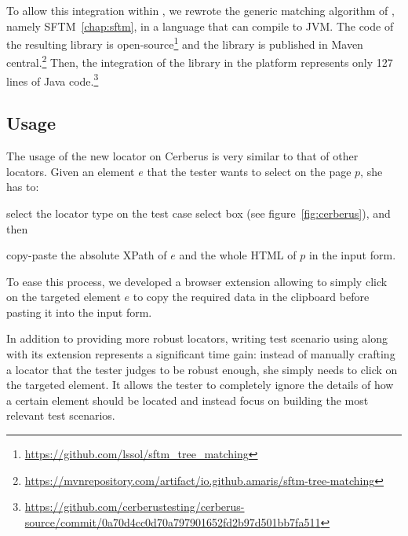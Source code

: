 
To allow this integration within \cerberus, we rewrote the generic matching algorithm of \erratum, namely SFTM~\ref{chap:sftm}, in a language that can compile to JVM.
The code of the resulting library is open-source\footnote{\url{https://github.com/lssol/sftm\_tree\_matching}} and the library is published in Maven central.\footnote{\url{https://mvnrepository.com/artifact/io.github.amaris/sftm-tree-matching}}
Then, the integration of the \erratum library in the \cerberus platform represents only 127 lines of Java code.\footnote{\url{https://github.com/cerberustesting/cerberus-source/commit/0a70d4cc0d70a797901652fd2b97d501bb7fa511}}

\subsection{Usage}
The usage of the new \erratum locator on Cerberus is very similar to that of other locators.
Given an element $e$ that the tester wants to select on the page $p$, she has to:
\begin{compactenum}
\item select the \erratum locator type on the test case select box (see figure~\ref{fig:cerberus}), and then
\item copy-paste the absolute XPath of $e$ and the whole HTML of $p$ in the input form.
\end{compactenum}
To ease this process, we developed a browser extension allowing to simply click on the targeted element $e$ to copy the required data in the clipboard before pasting it into the input form.

In addition to providing more robust locators, writing test scenario using \erratum along with its extension represents a significant time gain: instead of manually crafting a locator that the tester judges to be robust enough, she simply needs to click on the targeted element. 
It allows the tester to completely ignore the details of how a certain element should be located and instead focus on building the most relevant test scenarios.

